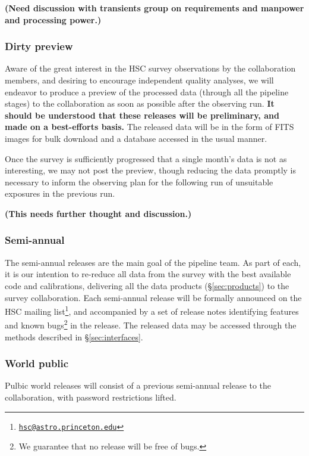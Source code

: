 \documentclass[12pt]{article}
\newcommand\tbd[1]{\textbf{\color{red}(#1)}}
\def\email#1{\href{mailto:#1}{\nolinkurl{#1}}}
\begin{document}
\tbd{Need discussion with transients group on requirements
and manpower and processing power.}

\subsubsection{Dirty preview}

Aware of the great interest in the HSC survey observations by the collaboration members, and desiring to
encourage independent quality analyses, we will endeavor to produce a preview of the processed data (through
all the pipeline stages) to the collaboration as soon as possible after the observing run.  {\bf It should
be understood that these releases will be preliminary, and made on a best-efforts basis.}  The released data
will be in the form of FITS images for bulk download and a database accessed in the usual manner.

Once the survey is sufficiently progressed that a single month's data is not as interesting, we may not post
the preview, though reducing the data promptly is necessary to inform the observing plan for the following run
of unsuitable exposures in the previous run.

\tbd{This needs further thought and discussion.}

\subsubsection{Semi-annual}

The semi-annual releases are the main goal of the pipeline team.  As part of each, it is our intention to
re-reduce all data from the survey with the best available code and calibrations, delivering all the data
products (\S\ref{sec:products}) to the survey collaboration.  Each semi-annual release will be formally
announced on the HSC mailing list\footnote{\email{hsc@astro.princeton.edu}}, and accompanied by a set of
release notes identifying features and known bugs\footnote{We guarantee that no release will be free of bugs.}
in the release.  The released data may be accessed through the methods described in \S\ref{sec:interfaces}.


\subsubsection{World public}

Pulbic world releases will consist of a previous semi-annual release to the collaboration, with password
restrictions lifted.
\end{document}

